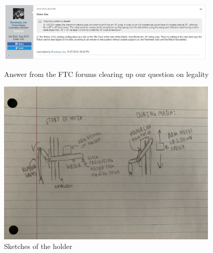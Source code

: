 \begin{figure}[ht]
\centering
\begin{minipage}[b]{.48\textwidth}
  \centering
  \includegraphics[width=0.95\textwidth]{Meetings/November/11-06-21/11-6-21_Hardware_Figure3 - Nathan Forrer.JPG}
  \caption{Answer from the FTC forums clearing up our question on legality}
  \label{fig:pic3}
\end{minipage}%
\hfill%
\begin{minipage}[b]{.48\textwidth}
  \centering
  \includegraphics[width=0.95\textwidth]{Meetings/November/11-06-21/11-6-21_Hardware_Figure4 - Nathan Forrer.JPG}
  \caption{Sketches of the holder}
  \label{fig:pic4}
\end{minipage}
\end{figure}



